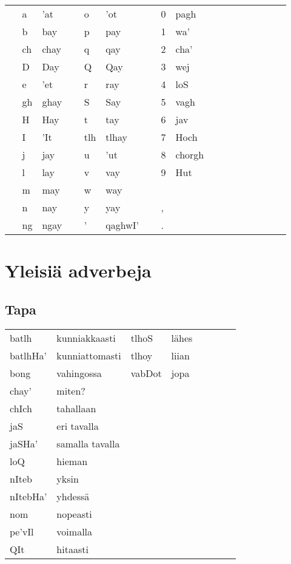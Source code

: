 \documentclass{book}
\begin{document}
\begin{tabular}{Tl Bl Il | Tl Bl Il | Tl l Il}
     & a & 'at &  & o & 'ot &  & 0 & pagh \\
     & b & bay &  & p & pay &  & 1 & wa' \\
     & ch & chay &  & q & qay &  & 2 & cha' \\
     & D & Day &  & Q & Qay &  & 3 & wej \\
     & e & 'et &  & r & ray &  & 4 & loS \\
     & gh & ghay &  & S & Say &  & 5 & vagh \\
     & H & Hay &  & t & tay &  & 6 & jav \\
     & I & 'It &  & tlh & tlhay &  & 7 & Hoch \\
     & j & jay &  & u & 'ut &  & 8 & chorgh\\
     & l & lay &  & v & vay &  & 9 & Hut\\
     & m & may &  & w & way & & & \\
     & n & nay &  & y & yay &  & , & \\
     & ng & ngay &  & ' & qaghwI' &  & . & \\
\end{tabular}

\chapter{Yleisiä adverbeja}
\label{apx:adverbit}

\section{Tapa}

\begin{tabular}{Bl Il | Bl Il}
    batlh & kunniakkaasti & tlhoS & lähes \\
    batlh­Ha' & kunniattomasti & tlhoy & liian \\
    bong & vahingossa & vabDot & jopa \\
    chay' & miten? & & \\
    chIch & tahallaan & & \\
    jaS & eri tavalla & & \\
    jaSHa' & samalla tavalla & & \\
    loQ & hieman & & \\
    nI­teb & yksin & & \\
    nI­teb­Ha' & yhdessä & & \\
    nom & nopeasti & & \\
    pe'­vIl & voimalla & & \\
    QIt & hitaasti & & \\
\end{tabular}
\end{document}
